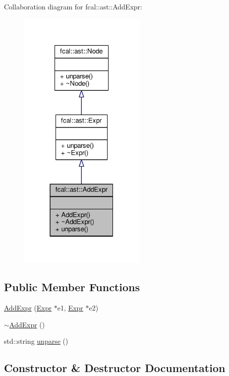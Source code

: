 Collaboration diagram for fcal\+:\+:ast\+:\+:Add\+Expr\+:
\nopagebreak
\begin{figure}[H]
\begin{center}
\leavevmode
\includegraphics[width=175pt]{classfcal_1_1ast_1_1AddExpr__coll__graph}
\end{center}
\end{figure}
\subsection*{Public Member Functions}
\begin{DoxyCompactItemize}
\item 
\hyperlink{classfcal_1_1ast_1_1AddExpr_a005cbd687ea20133b01c22c32eea9c90}{Add\+Expr} (\hyperlink{classfcal_1_1ast_1_1Expr}{Expr} $\ast$e1, \hyperlink{classfcal_1_1ast_1_1Expr}{Expr} $\ast$e2)
\item 
\hyperlink{classfcal_1_1ast_1_1AddExpr_a91782fde0bf3227f8a459918e7884ef0}{$\sim$\+Add\+Expr} ()
\item 
std\+::string \hyperlink{classfcal_1_1ast_1_1AddExpr_ab091a379ec85a4f0d3861f440d3fb54e}{unparse} ()
\end{DoxyCompactItemize}


\subsection{Constructor \& Destructor Documentation}
